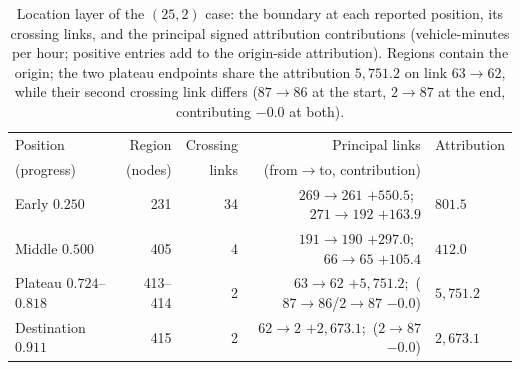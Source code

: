 \begin{table}[pos=htbp]\centering\footnotesize
\caption{Location layer of the $(25,2)$ case: the boundary at each
reported position, its crossing links, and the principal signed
attribution contributions (vehicle-minutes per hour; positive entries
add to the origin-side attribution). Regions contain the origin; the two
plateau endpoints share the attribution $5{,}751.2$ on link
$63\!\to\!62$, while their second crossing link differs ($87\!\to\!86$
at the start, $2\!\to\!87$ at the end, contributing $-0.0$ at
both).}\label{tab:anaheimcrossing}
\setlength{\tabcolsep}{4pt}
\begin{tabular*}{\tblwidth}{@{\extracolsep{\fill}}lrrrl}
\toprule
Position & Region & Crossing & Principal links & Attribution\\
(progress) & (nodes) & links & (from$\to$to, contribution) &\\
\midrule
Early $0.250$ & 231 & 34 & $269\!\to\!261$ $+550.5$;\ $271\!\to\!192$ $+163.9$ & $801.5$\\
Middle $0.500$ & 405 & 4 & $191\!\to\!190$ $+297.0$;\ $66\!\to\!65$ $+105.4$ & $412.0$\\
Plateau $0.724$--$0.818$ & 413--414 & 2 & $63\!\to\!62$ $+5{,}751.2$;\ ($87\!\to\!86$/$2\!\to\!87$ $-0.0$) & $5{,}751.2$\\
Destination $0.911$ & 415 & 2 & $62\!\to\!2$ $+2{,}673.1$;\ ($2\!\to\!87$ $-0.0$) & $2{,}673.1$\\
\bottomrule\end{tabular*}\end{table}
